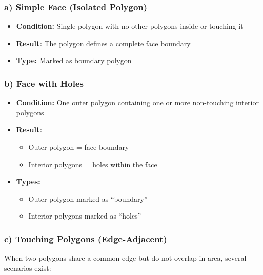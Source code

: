 \documentclass[11pt,a4paper]{article}
\begin{document}
\subsubsection{a) Simple Face (Isolated Polygon)}

\begin{itemize}
    \item \textbf{Condition:} Single polygon with no other polygons inside or touching it
    \item \textbf{Result:} The polygon defines a complete face boundary
    \item \textbf{Type:} Marked as boundary polygon
\end{itemize}

\subsubsection{b) Face with Holes}

\begin{itemize}
    \item \textbf{Condition:} One outer polygon containing one or more non-touching interior polygons
    \item \textbf{Result:}
    \begin{itemize}
        \item Outer polygon = face boundary
        \item Interior polygons = holes within the face
    \end{itemize}
    \item \textbf{Types:}
    \begin{itemize}
        \item Outer polygon marked as ``boundary''
        \item Interior polygons marked as ``holes''
    \end{itemize}
\end{itemize}

\subsubsection{c) Touching Polygons (Edge-Adjacent)}

When two polygons share a common edge but do not overlap in area, several scenarios exist:
\end{document}
